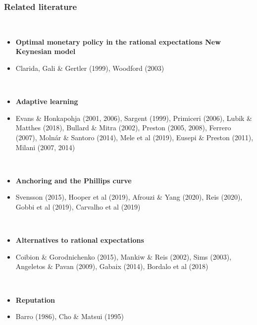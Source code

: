 \documentclass[10pt]{beamer}
\begin{document}
\begin{frame}
	\frametitle{Related literature}

\

\footnotesize{
\begin{itemize}
\item \textbf{Optimal monetary policy in the rational expectations New Keynesian model}
\item[] Clarida, Gali \& Gertler (1999), Woodford (2003)

\


\item \textbf{Adaptive learning}
\item[] Evans \& Honkapohja (2001, 2006), Sargent (1999), Primiceri (2006), Lubik \& Matthes (2018), Bullard \& Mitra (2002), Preston (2005, 2008), Ferrero (2007), Moln\'ar \& Santoro (2014), Mele et al (2019), Eusepi \& Preston (2011), Milani (2007, 2014)

\

\item \textbf{Anchoring and the Phillips curve} 
\item[] Svensson (2015), Hooper et al (2019), Afrouzi \& Yang (2020), Reis (2020), Gobbi et al (2019), Carvalho et al (2019)

\

\item \textbf{Alternatives to rational expectations} 
\item[] Coibion \& Gorodnichenko (2015), Mankiw \& Reis (2002), Sims (2003), Angeletos \& Pavan (2009), Gabaix (2014), Bordalo et al (2018)

\

\item \textbf{Reputation} 
\item[] Barro (1986), Cho \& Matsui (1995)
\end{itemize}

}

\end{frame}
\end{document}
